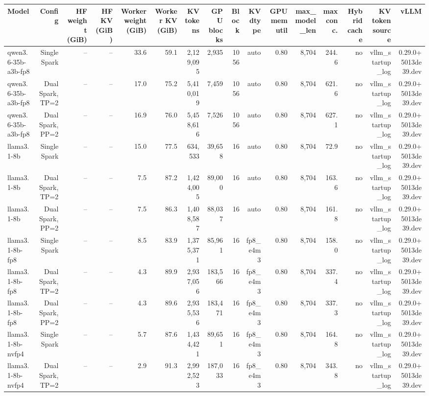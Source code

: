 \begin{tabular}{l r r r r r r r r r r r r r r r }
\toprule
Model & Config & HF weight (GiB) & HF KV (GiB) & Worker weight (GiB) & Worker KV (GiB) & KV tokens & GPU blocks & Block & KV dtype & GPU mem util & max\_model\_len & max conc. & Hybrid cache & KV token source & vLLM \\
\midrule
qwen3.6-35b-a3b-fp8 & Single Spark & -- & -- & 33.6 & 59.1 & 2,129,095 & 2,935 & 1056 & auto & 0.80 & 8,704 & 244.6 & no & vllm\_startup\_log & 0.29.0+5013de39.dev \\
qwen3.6-35b-a3b-fp8 & Dual Spark, TP=2 & -- & -- & 17.0 & 75.2 & 5,410,019 & 7,459 & 1056 & auto & 0.80 & 8,704 & 621.6 & no & vllm\_startup\_log & 0.29.0+5013de39.dev \\
qwen3.6-35b-a3b-fp8 & Dual Spark, PP=2 & -- & -- & 16.9 & 76.0 & 5,458,616 & 7,526 & 1056 & auto & 0.80 & 8,704 & 627.1 & no & vllm\_startup\_log & 0.29.0+5013de39.dev \\
llama3.1-8b & Single Spark & -- & -- & 15.0 & 77.5 & 634,533 & 39,658 & 16 & auto & 0.80 & 8,704 & 72.9 & no & vllm\_startup\_log & 0.29.0+5013de39.dev \\
llama3.1-8b & Dual Spark, TP=2 & -- & -- & 7.5 & 87.2 & 1,424,005 & 89,000 & 16 & auto & 0.80 & 8,704 & 163.6 & no & vllm\_startup\_log & 0.29.0+5013de39.dev \\
llama3.1-8b & Dual Spark, PP=2 & -- & -- & 7.5 & 86.3 & 1,408,587 & 88,037 & 16 & auto & 0.80 & 8,704 & 161.8 & no & vllm\_startup\_log & 0.29.0+5013de39.dev \\
llama3.1-8b-fp8 & Single Spark & -- & -- & 8.5 & 83.9 & 1,375,371 & 85,961 & 16 & fp8\_e4m3 & 0.80 & 8,704 & 158.0 & no & vllm\_startup\_log & 0.29.0+5013de39.dev \\
llama3.1-8b-fp8 & Dual Spark, TP=2 & -- & -- & 4.3 & 89.9 & 2,937,056 & 183,566 & 16 & fp8\_e4m3 & 0.80 & 8,704 & 337.4 & no & vllm\_startup\_log & 0.29.0+5013de39.dev \\
llama3.1-8b-fp8 & Dual Spark, PP=2 & -- & -- & 4.3 & 89.6 & 2,935,536 & 183,471 & 16 & fp8\_e4m3 & 0.80 & 8,704 & 337.3 & no & vllm\_startup\_log & 0.29.0+5013de39.dev \\
llama3.1-8b-nvfp4 & Single Spark & -- & -- & 5.7 & 87.6 & 1,434,421 & 89,651 & 16 & fp8\_e4m3 & 0.80 & 8,704 & 164.8 & no & vllm\_startup\_log & 0.29.0+5013de39.dev \\
llama3.1-8b-nvfp4 & Dual Spark, TP=2 & -- & -- & 2.9 & 91.3 & 2,992,523 & 187,033 & 16 & fp8\_e4m3 & 0.80 & 8,704 & 343.8 & no & vllm\_startup\_log & 0.29.0+5013de39.dev \\

\end{tabular}
